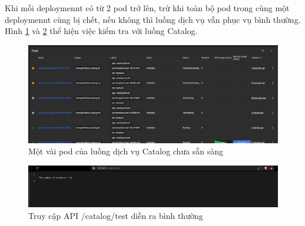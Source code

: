 Khi mỗi deploymennt có từ 2 pod trở lên, trừ khi toàn bộ pod trong cùng một deploymennt cùng bị chết, nếu không thì luồng dịch vụ vẫn phục vụ bình thường.\\[0.5cm]
Hình \ref{fig:catalog-test-api-pod-creating} và \ref{fig:catalog-test-api-show} thể hiện việc kiểm tra với luồng Catalog.

\begin{figure}[H]
  \begin{center}
      \includegraphics[scale = 0.5]{images/hanh/catalog-test-api-pods-creating}
      \vspace*{1mm}
  \end{center}
  \caption{Một vài pod của luồng dịch vụ Catalog chưa sẵn sàng}
  \label{fig:catalog-test-api-pod-creating}

\end{figure}

\begin{figure}[H]
  \begin{center}
      \includegraphics[scale = 0.6]{images/hanh/catalog-test-api-show}
      \vspace*{1mm}
  \end{center}
  \caption{Truy cập API /catalog/test diễn ra bình thường}
  \label{fig:catalog-test-api-show}

\end{figure}

